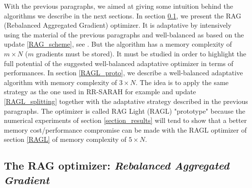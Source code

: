 %
%
%

With the previous paragraphs, we aimed at giving some intuition behind the algorithms we describe in the next sections. 
In section \ref{RAG}, we present the RAG (Rebalanced Aggregated Gradient) optimizer. It is adaptative by intensively using the material of the previous paragraphs and well-balanced
as based on the update \eqref{RAG_scheme}, see \cite{partI}. But the
algorithm has a memory complexity of $m\times N$ ($m$ gradients must be stored). 
It must be studied in order to highlight the full potential of the suggested well-balanced adaptative optimizer in terms of performances. 
In section \ref{RAGL_proto}, we describe a well-balanced adaptative algorithm with memory complexity of $3\times N$. The idea is to apply the same strategy as the one used in
RR-SARAH for example and update \eqref{RAGL_splitting} together with the adaptative strategy described in the previous paragraphs. The optimizer is called RAG Light (RAGL) "prototype" because
the
numerical experiments of section \ref{section_results} will tend to show that a better memory cost/performance compromise can be made with the RAGL optimizer of section \ref{RAGL}
of memory complexity of $5\times N$. 


\subsection{The RAG optimizer: {\it Rebalanced Aggregated Gradient}}
\label{RAG}

